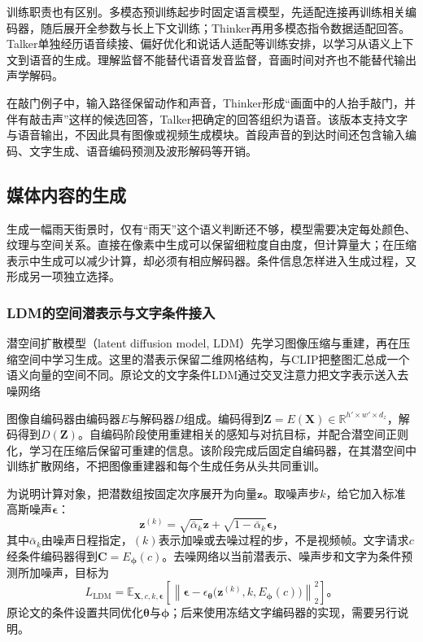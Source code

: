 训练职责也有区别。多模态预训练起步时固定语言模型，先适配连接再训练相关编码器，随后展开全参数与长上下文训练；Thinker再用多模态指令数据适配回答。Talker单独经历语音续接、偏好优化和说话人适配等训练安排，以学习从语义上下文到语音的生成。理解监督不能替代语音发音监督，音画时间对齐也不能替代输出声学解码。

在敲门例子中，输入路径保留动作和声音，Thinker形成“画面中的人抬手敲门，并伴有敲击声”这样的候选回答，Talker把确定的回答组织为语音。该版本支持文字与语音输出，不因此具有图像或视频生成模块。首段声音的到达时间还包含输入编码、文字生成、语音编码预测及波形解码等开销。

\subsection{媒体内容的生成}
\label{sec:vision-models-media-generation}

生成一幅雨天街景时，仅有“雨天”这个语义判断还不够，模型需要决定每处颜色、纹理与空间关系。直接在像素中生成可以保留细粒度自由度，但计算量大；在压缩表示中生成可以减少计算，却必须有相应解码器。条件信息怎样进入生成过程，又形成另一项独立选择。

\subsubsection{LDM的空间潜表示与文字条件接入}
\label{sec:vision-models-ldm}

潜空间扩散模型（latent diffusion model, LDM）先学习图像压缩与重建，再在压缩空间中学习生成。这里的潜表示保留二维网格结构，与CLIP把整图汇总成一个语义向量的空间不同。原论文的文字条件LDM通过交叉注意力把文字表示送入去噪网络

图像自编码器由编码器$E$与解码器$D$组成。编码得到$\bm Z=E(\bm X)\in\mathbb R^{h'\times w'\times d_z}$，解码得到$D(\bm Z)$。自编码阶段使用重建相关的感知与对抗目标，并配合潜空间正则化，学习在压缩后保留可重建的信息。该阶段完成后固定自编码器，在其潜空间中训练扩散网络，不把图像重建器和每个生成任务从头共同重训。

为说明计算对象，把潜数组按固定次序展开为向量$\bm z$。取噪声步$k$，给它加入标准高斯噪声$\bm\epsilon$：
\[
  \bm z^{(k)}
  =\sqrt{\bar\alpha_k}\bm z+
    \sqrt{1-\bar\alpha_k}\bm\epsilon\text{，}
\]
其中$\bar\alpha_k$由噪声日程指定，$(k)$表示加噪或去噪过程的步，不是视频帧。文字请求$c$经条件编码器得到$\bm C=E_{\bm\phi}(c)$。去噪网络以当前潜表示、噪声步和文字为条件预测所加噪声，目标为
\begin{equation}
  L_{\mathrm{LDM}}
  =\mathbb E_{\bm X,c,k,\bm\epsilon}
    \left[
      \left\lVert\bm\epsilon-
      \epsilon_{\bm\theta}
      \bigl(\bm z^{(k)},k,E_{\bm\phi}(c)\bigr)
      \right\rVert_2^2
    \right]\text{。}
  \label{eq:vision-ldm-objective}
\end{equation}
原论文的条件设置共同优化$\bm\theta$与$\bm\phi$；后来使用冻结文字编码器的实现，需要另行说明。

